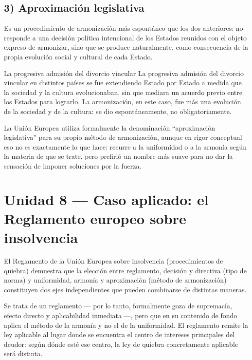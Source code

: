 \documentclass[12pt,oneside]{book}
\begin{document}
\subsection*{3) Aproximación legislativa}

Es un procedimiento de armonización más espontáneo que los dos anteriores: no responde a una decisión política intencional de los Estados reunidos con el objeto expreso de armonizar, sino que se produce naturalmente, como consecuencia de la propia evolución social y cultural de cada Estado.

\begin{example}{La progresiva admisión del divorcio vincular}
La progresiva admisión del divorcio vincular en distintos países se fue extendiendo Estado por Estado a medida que la sociedad y la cultura evolucionaban, sin que mediara un acuerdo previo entre los Estados para lograrlo. La armonización, en este caso, fue más una evolución de la sociedad y de la cultura: se dio espontáneamente, no obligatoriamente.
\end{example}

\begin{note}
La Unión Europea utiliza formalmente la denominación ``aproximación legislativa'' para su propio método de armonización, aunque en rigor conceptual eso no es exactamente lo que hace: recurre a la uniformidad o a la armonía según la materia de que se trate, pero prefirió un nombre más suave para no dar la sensación de imponer soluciones por la fuerza.
\end{note}

\section{Unidad 8 --- Caso aplicado: el Reglamento europeo sobre insolvencia}

El Reglamento de la Unión Europea sobre insolvencia (procedimientos de quiebra) demuestra que la elección entre reglamento, decisión y directiva (tipo de norma) y uniformidad, armonía y aproximación (método de armonización) constituyen dos ejes independientes que pueden combinarse de distintas maneras.

Se trata de un reglamento --- por lo tanto, formalmente goza de supremacía, efecto directo y aplicabilidad inmediata ---, pero que en su contenido de fondo aplica el método de la armonía y no el de la uniformidad. El reglamento remite la ley aplicable al lugar donde se encuentra el centro de intereses principales del deudor: según dónde esté ese centro, la ley de quiebra concretamente aplicable será distinta.
\end{document}
